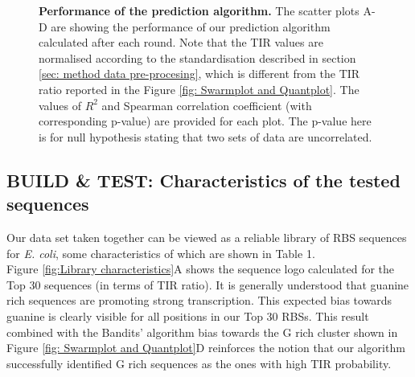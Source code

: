 \documentclass{article}
\begin{document}
\begin{figure}[!ht]
\begin{subfigure}[b]{0.49\textwidth}
    \end{subfigure}
    \caption{\textbf{Performance of the prediction algorithm.} The scatter plots A-D are showing the performance of our prediction algorithm calculated after each round.
    Note that the TIR values are normalised according to the standardisation described in section \ref{sec: method data pre-procesing}, which is different from the TIR ratio reported in the Figure \ref{fig: Swarmplot and Quantplot}.
    The values of $R^2$ and Spearman correlation coefficient (with corresponding p-value) are provided for each plot.
    The p-value here is for null hypothesis stating that two sets of data are uncorrelated.
    }
    \label{fig: Scatterplot}
\end{figure}

\subsection{BUILD \& TEST: Characteristics of the tested sequences}
\label{sec:characteristics-of-library}

Our data set taken together can be viewed as a reliable library of RBS sequences for \emph{E. coli}, some characteristics of which are shown in Table 1.\\

Figure \ref{fig:Library characteristics}A shows the sequence logo calculated for the Top 30 sequences (in terms of TIR ratio).
It is generally understood that guanine rich sequences are promoting strong transcription.
This expected bias towards guanine is clearly visible for all positions in our Top 30 RBSs.
This result combined with the Bandits' algorithm bias towards the G rich cluster shown in Figure \ref{fig: Swarmplot and Quantplot}D reinforces the notion that our algorithm successfully identified G rich sequences as the ones with high TIR probability.\\
\end{document}
